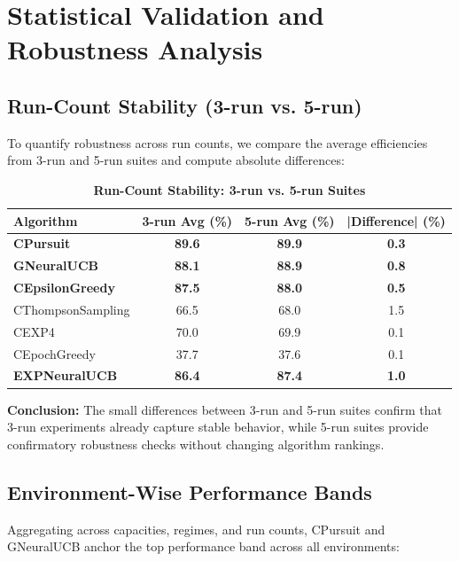 \documentclass[12pt,a4paper]{article}
\newcommand{\success}[1]{\textcolor{successcolor}{\textbf{#1}}}
\newcommand{\legacy}[1]{\textcolor{legacycolor}{\textbf{#1}}}
\newcommand{\neural}[1]{\textcolor{neuralcolor}{\textbf{#1}}}
\begin{document}
\section{Statistical Validation and Robustness Analysis}

\subsection{Run-Count Stability (3-run vs. 5-run)}

To quantify robustness across run counts, we compare the average efficiencies from 3-run and 5-run suites and compute absolute differences:

\begin{table}[H]
\centering
\caption{\success{Run-Count Stability: 3-run vs. 5-run Suites}}
\begin{tabular}{|l|c|c|c|}
\hline
\textbf{Algorithm} & \textbf{3-run Avg (\%)} & \textbf{5-run Avg (\%)} & \textbf{|Difference| (\%)} \\
\hline
\hline
\success{CPursuit}        & \success{89.6} & \success{89.9} & \success{0.3} \\
\neural{GNeuralUCB}       & \neural{88.1} & \neural{88.9} & \neural{0.8} \\
\success{CEpsilonGreedy} & \success{87.5} & \success{88.0} & \success{0.5} \\
CThompsonSampling        & 66.5          & 68.0          & 1.5 \\
CEXP4                    & 70.0          & 69.9          & 0.1 \\
CEpochGreedy             & 37.7          & 37.6          & 0.1 \\
\legacy{EXPNeuralUCB}    & \legacy{86.4} & \legacy{87.4} & \legacy{1.0} \\
\hline
\end{tabular}
\end{table}

\textbf{Conclusion:} The small differences between 3-run and 5-run suites confirm that 3-run experiments already capture stable behavior, while 5-run suites provide confirmatory robustness checks without changing algorithm rankings.

\subsection{Environment-Wise Performance Bands}

Aggregating across capacities, regimes, and run counts, CPursuit and GNeuralUCB anchor the top performance band across all environments:
\end{document}
